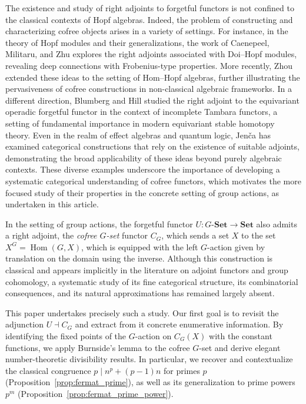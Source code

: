 \documentclass{amsart}
\begin{document}
The existence and study of right adjoints to forgetful functors is not confined to the classical contexts of Hopf algebras. Indeed, the problem of constructing and characterizing cofree objects arises in a variety of settings. For instance, in the theory of Hopf modules and their generalizations, the work of Caenepeel, Militaru, and Zhu \cite{Caenepeel1997DOI-HOPF} explores the right adjoints associated with Doi–Hopf modules, revealing deep connections with Frobenius-type properties. More recently, Zhou \cite{Zhou2019Doi-Hopf} extended these ideas to the setting of Hom–Hopf algebras, further illustrating the pervasiveness of cofree constructions in non-classical algebraic frameworks. In a different direction, Blumberg and Hill \cite{Blumberg2017The} studied the right adjoint to the equivariant operadic forgetful functor in the context of incomplete Tambara functors, a setting of fundamental importance in modern equivariant stable homotopy theory. Even in the realm of effect algebras and quantum logic, Jenča \cite{Jenča2015A} has examined categorical constructions that rely on the existence of suitable adjoints, demonstrating the broad applicability of these ideas beyond purely algebraic contexts. These diverse examples underscore the importance of developing a systematic categorical understanding of cofree functors, which motivates the more focused study of their properties in the concrete setting of group actions, as undertaken in this article.

In the setting of group actions, the forgetful functor $U: G\text{-}\mathbf{Set} \rightarrow \mathbf{Set}$ also admits a right adjoint, the \emph{cofree $G$-set} functor $C_G$, which sends a set $X$ to the set $X^G = \operatorname{Hom}(G,X)$, which is equipped with the left $G$-action given by translation on the domain using the inverse. Although this construction is classical and appears implicitly in the literature on adjoint functors and group cohomology, a systematic study of its fine categorical structure, its combinatorial consequences, and its natural approximations has remained largely absent.

This paper undertakes precisely such a study. Our first goal is to revisit the adjunction $U \dashv C_G$ and extract from it concrete enumerative information. By identifying the fixed points of the $G$-action on $C_G(X)$ with the constant functions, we apply Burnside's lemma to the cofree $G$-set and derive elegant number-theoretic divisibility results. In particular, we recover and contextualize the classical congruence $p \mid n^p + (p-1)n$ for primes $p$ (Proposition~\ref{prop:fermat_prime}), as well as its generalization to prime powers $p^m$ (Proposition~\ref{prop:fermat_prime_power}).
\end{document}
